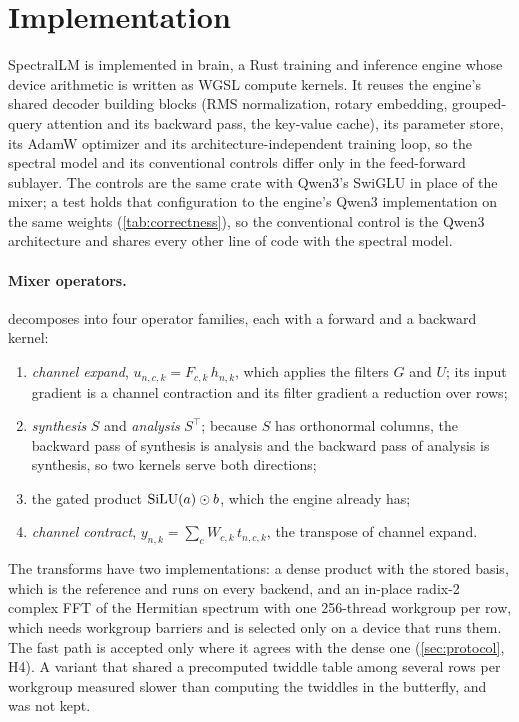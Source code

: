 
\section{Implementation}
\label{sec:implementation}

SpectralLM is implemented in brain, a Rust training and inference engine whose
device arithmetic is written as WGSL compute kernels. It reuses the engine's
shared decoder building blocks (RMS normalization, rotary embedding,
grouped-query attention and its backward pass, the key-value cache), its
parameter store, its AdamW optimizer and its architecture-independent training
loop, so the spectral model and its conventional controls differ only in the
feed-forward sublayer. The controls are the same crate with Qwen3's SwiGLU in
place of the mixer; a test holds that configuration to the engine's Qwen3
implementation on the same weights (\cref{tab:correctness}), so the
conventional control is the Qwen3 architecture and shares every other line of
code with the spectral model.

\paragraph{Mixer operators.}  decomposes into four operator
families, each with a forward and a backward kernel:
\begin{enumerate}
\item \emph{channel expand}, $u_{n,c,k}=F_{c,k}\,h_{n,k}$, which applies the
  filters $G$ and $U$; its input gradient is a channel contraction and its
  filter gradient a reduction over rows;
\item \emph{synthesis} $S$ and \emph{analysis} $S^\top$; because $S$ has
  orthonormal columns, the backward pass of synthesis is analysis and the
  backward pass of analysis is synthesis, so two kernels serve both
  directions;
\item the gated product $\operatorname{SiLU}(a)\odot b$, which the engine already has;
\item \emph{channel contract}, $y_{n,k}=\sum_c W_{c,k}\,t_{n,c,k}$, the
  transpose of channel expand.
\end{enumerate}
The transforms have two implementations: a dense product with the stored
basis, which is the reference and runs on every backend, and an in-place
radix-2 complex FFT of the Hermitian spectrum with one 256-thread workgroup
per row, which needs workgroup barriers and is selected only on a device that
runs them. The fast path is accepted only where it agrees with the dense one
(\cref{sec:protocol}, H4). A variant that shared a precomputed twiddle table
among several rows per workgroup measured slower than computing the twiddles
in the butterfly, and was not kept.


